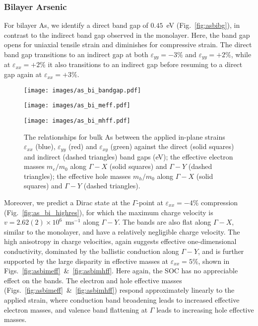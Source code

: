 \subsubsection{Bilayer Arsenic}
For bilayer As, we identify a 
direct band gap of $0.45$~eV 
(Fig.~\ref{fig:asbibg}), 
in contrast to the indirect band gap 
observed in the monolayer.
%
Here, the band gap opens 
for uniaxial tensile strain 
and diminishes for compressive strain.
%
The direct band gap transitions
to an indirect gap at both 
$\varepsilon_{yy}=-3\%$ and 
$\varepsilon_{yy}=+2\%$, 
while at 
$\varepsilon_{xx}=+2\%$ 
it also transitions to an indirect gap 
before resuming to a 
direct gap again at $\varepsilon_{xx}=+3\%$.

\begin{figure}[th!]
\begin{subfloat}{
  \centering
\texttt{[image: images/as\_bi\_bandgap.pdf]}
  \label{fig:asbibg}}
\end{subfloat}
%
\begin{subfloat}[Bilayer As $m_e/m_0$]{
\texttt{[image: images/as\_bi\_meff.pdf]}
  \label{fig:asbimeff}}
\end{subfloat}
%
\begin{subfloat}[Bilayer As $m_h/m_0$]{
\texttt{[image: images/as\_bi\_mhff.pdf]}
  \label{fig:asbimhff}}
\end{subfloat}
\caption[Electronic properties of bilayer arsenic for in-plane strains]
{The relationships for bulk As between 
the applied in-plane strains $\varepsilon_{xx}$ (blue),
$\varepsilon_{yy}$ (red) and $\varepsilon_{xy}$ (green) against 
%
\protect{} 
the direct (solid  squares) and indirect 
(dashed triangles) band gaps (eV);
%
\protect{}
the effective electron masses $m_e/m_0$ 
along $\Gamma-X$ (solid squares) and 
$\Gamma-Y$ (dashed triangles);
%
\protect{}
the effective hole masses $m_h/m_0$ 
along $\Gamma-X$ (solid squares) and 
$\Gamma-Y$ (dashed triangles).}
\label{fig:as_bi_elec_properties}
\end{figure}

{
Moreover, we predict a Dirac state 
at the $\Gamma$-point 
at $\varepsilon_{xx}=-4\%$ compression 
(Fig.~\ref{fig:as_bi_highres}), 
for which the maximum charge velocity 
is $v=2.62(2)\times10^6$~$\textrm{ms}^{-1}$ 
along $\Gamma-Y$.
%
The bands are also flat 
along $\Gamma-X$, 
similar to the monolayer,
and have a relatively negligible charge velocity.
%
The high anisotropy in charge velocities, 
again suggests effective one-dimensional conductivity, 
dominated by the ballistic conduction along $\Gamma-Y$,
and is further supported by 
the large disparity in effective 
masses at $\varepsilon_{xx}=5\%$, 
shown in Figs.~\ref{fig:asbimeff}~\&~\ref{fig:asbimhff}.}
%
Here again, the SOC has no appreciable 
effect on the bands.
%
The electron and hole effective masses 
(Figs.~\ref{fig:asbimeff}~\&~\ref{fig:asbimhff})
respond approximately linearly 
to the applied strain, 
where conduction band broadening 
leads to increased 
effective electron masses, 
and valence band flattening at $\Gamma$
leads to increasing hole effective masses. 

